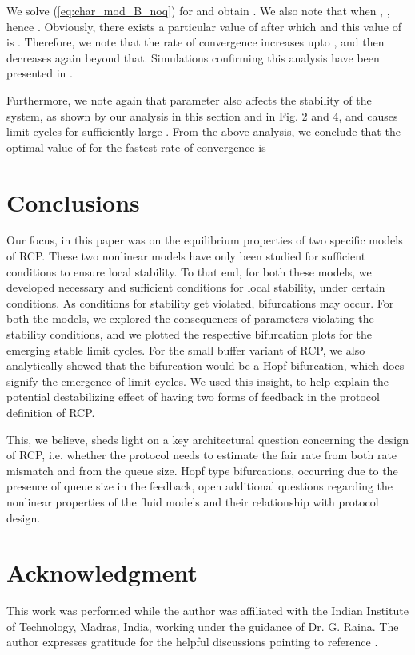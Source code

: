 \documentclass[conference]{IEEEtran}
\begin{document}
We solve (\ref{eq:char_mod_B_noq}) for  and obtain . We also note that when 
, , hence 
. Obviously, there exists a particular value of  after which 
 and this value of  is . Therefore, we note that the rate of 
convergence increases upto , and then decreases again beyond that. Simulations confirming this analysis have been presented in 
\cite{NanditaPhD}.

Furthermore, we note again that parameter  also affects the stability of the system, as shown by our analysis in this section and in Fig. 2 and 4, and causes limit cycles for sufficiently large . From the above analysis, we conclude that the optimal value of  for the fastest rate of convergence is


\section{Conclusions}                  

Our focus, in this paper was on the equilibrium properties of two specific models of RCP. These two nonlinear models have only been studied for sufficient conditions to ensure local stability. To that end, for both these models, we developed necessary and sufficient conditions for local stability, under certain conditions. As conditions for stability get violated, bifurcations may occur. For both the models, we explored the consequences of parameters violating the stability conditions, and we plotted the respective bifurcation plots for the emerging stable limit cycles. For the small buffer variant of RCP, we also analytically showed that the bifurcation would be a Hopf bifurcation, which does signify the emergence of limit cycles. We used this insight, to help explain the potential destabilizing effect of having two forms of feedback in the protocol definition of RCP.    

This, we believe, sheds light on a key architectural question concerning the design of RCP, i.e. whether the protocol needs to estimate the fair rate from both rate mismatch and from the queue size. Hopf type bifurcations, occurring due to the presence of queue size in the feedback, open additional questions regarding the nonlinear properties of the fluid models and their relationship with protocol design.



\section*{Acknowledgment}
This work was performed while the author was affiliated with the Indian Institute of Technology, Madras, India, working under the guidance of Dr. G. Raina. The author expresses gratitude for the helpful discussions pointing to reference \cite{krv}.


\balance


\end{document}
